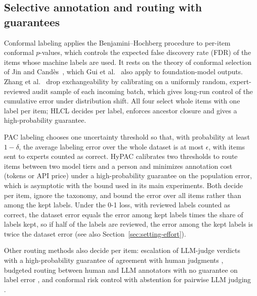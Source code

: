 \documentclass[preprint,12pt]{elsarticle}
\theoremstyle{definition}
\newcommand{\hlcl}{\textup{\textsc{HLCL}}}
\begin{document}
\subsection{Selective annotation and routing with guarantees}
\label{sec:related-routing}
Conformal labeling \citep{huang2025selective} applies the Benjamini--Hochberg
procedure \citep{benjamini1995fdr} to per-item conformal $p$-values, which
controls the expected false discovery rate (FDR) of the items whose machine
labels are used. It rests on the theory of conformal selection of
Jin and Cand\`es~\cite{jin2023selection}, which Gui et al.~\cite{gui2024conformalalignment}
also apply to foundation-model outputs. Zhang et al.~\cite{zhang2026cared} drop
exchangeability by calibrating on a uniformly random, expert-reviewed audit
sample of each incoming batch, which gives long-run control of the cumulative
error under distribution shift. All four select whole items with one label per item;
\hlcl{} decides per label, enforces ancestor closure and gives a
high-probability guarantee.

PAC labeling \citep{candes2026pac} chooses one uncertainty threshold so that,
with probability at least $1-\delta$, the average labeling error over the whole
dataset is at most $\epsilon$, with items sent to experts counted as correct.
HyPAC \citep{zeng2026hypac} calibrates two thresholds to route items between two
model tiers and a person and minimizes annotation cost (tokens or API price)
under a high-probability guarantee on the population error, which is asymptotic
with the bound used in its main experiments. Both decide per item, ignore the
taxonomy, and bound the error over all items rather than among the kept labels.
Under the 0-1 loss, with reviewed labels counted as correct, the dataset error
equals the error among kept labels times the share of labels kept, so if half
of the labels are reviewed, the error among the kept labels is twice the
dataset error (see also Section~\ref{sec:setting-effort}).

Other routing methods also decide per item: escalation of LLM-judge verdicts
with a high-probability guarantee of agreement with human judgments
\citep{jung2025trust}, budgeted routing between human and LLM annotators with
no guarantee on label error \citep{quorum2026}, and conformal risk control with abstention for pairwise LLM
judging \citep{cheng2026multiexpert}.
\end{document}
